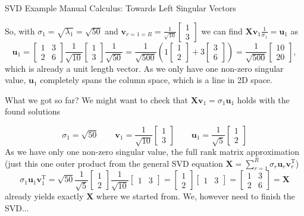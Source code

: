 \documentclass[mathserif, aspectratio=1610]{intbeamer}
\begin{document}
\begin{frame}[t]{SVD Example Manual Calculus: Towards Left Singular Vectors}

So, with $\sigma_1 = \sqrt{\lambda_1} = \sqrt{50}$ and $\bm{v}_{r=1=R} =
\frac{1}{\sqrt{10}}
\begin{bmatrix}
1 \\3
\end{bmatrix}$
we can find $\bm{X} \bm{v}_{1} \frac{1}{\sigma_1} = \bm{u}_{1}$ as
$$\bm{u}_{1} = \begin{bmatrix}
1 & 3\\
2 & 6
\end{bmatrix}
\frac{1}{\sqrt{10}}
\begin{bmatrix}
1 \\3
\end{bmatrix}
\frac{1}{\sqrt{50}}
=
\frac{1}{\sqrt{500}}
(1
\begin{bmatrix}
1\\
2
\end{bmatrix}
+
3
\begin{bmatrix}
3\\
6
\end{bmatrix})
=
\frac{1}{\sqrt{500}}
\begin{bmatrix}
10\\
20
\end{bmatrix},
$$
which is already a unit length vector. As we only have one non-zero singular value, $\bm{u}_{1}$ completely spans the column space, which is a line in 2D space.

What we got so far? We might want to check that $\bm{X} \bm{v}_1 = \sigma_1 \bm{u}_1$ holds with the found solutions

$$
\sigma_1 = \sqrt{50}\qquad
\bm{v}_1=
\frac{1}{\sqrt{10}}
\begin{bmatrix}
1 \\3
\end{bmatrix}\qquad
\bm{u}_1 =
\frac{1}{\sqrt{5}}
\begin{bmatrix}
1\\
2
\end{bmatrix}
$$
As we have only one non-zero singular value, the full rank matrix approximation (just this one outer product from the general SVD equation $\bm{X} = \sum_{r=1}^{R} \sigma_r  \bm{u}_r \bm{v}^\mathrm{T}_r$)
$$\sigma_1  \bm{u}_1 \bm{v}^\mathrm{T}_1
= \sqrt{50} \frac{1}{\sqrt{5}}
\begin{bmatrix}
1\\
2
\end{bmatrix}
\frac{1}{\sqrt{10}}
\begin{bmatrix}
1 & 3
\end{bmatrix}
=
\begin{bmatrix}
1\\
2
\end{bmatrix}
\begin{bmatrix}
1 & 3
\end{bmatrix}
=
\begin{bmatrix}
1 & 3\\
2 & 6
\end{bmatrix}=\bm{X}
$$
already yields exactly $\bm{X}$ where we started from. We, however need to finish the SVD...
\end{frame}
\end{document}

